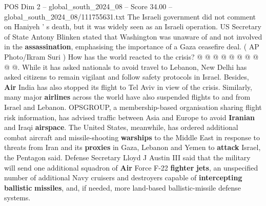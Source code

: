 \begin{textsample}{POS Dim 2 – global\_south\_2024\_08 – Score 34.00 – global\_south\_2024\_08/111755631.txt}
The Israeli government did not comment on Haniyeh ' s death, but it was widely seen as an Israeli operation.
US Secretary of State Antony Blinken stated that Washington was unaware of and not involved in the \textbf{assassination}, emphasising the importance of a Gaza ceasefire deal. ( AP Photo/Ikram Suri ) How has the world reacted to the crisis? @ @ @ @ @ @ @ @ @ @.
While it has asked nationals to avoid travel to Lebanon, New Delhi has asked citizens to remain vigilant and follow safety protocols in Israel.
Besides, \textbf{Air} India has also stopped its flight to Tel Aviv in view of the crisis.
Similarly, many major \textbf{airlines} across the world have also suspended flights to and from Israel and Lebanon.
OPSGROUP, a membership-based organisation sharing flight risk information, has advised traffic between Asia and Europe to avoid \textbf{Iranian} and Iraqi \textbf{airspace}.
The United States, meanwhile, has ordered additional combat aircraft and missile-shooting \textbf{warships} to the Middle East in response to threats from Iran and its \textbf{proxies} in Gaza, Lebanon and Yemen to \textbf{attack} Israel, the Pentagon said.
Defense Secretary Lloyd J Austin III said that the military will send one additional squadron of \textbf{Air} Force F-22 \textbf{fighter} \textbf{jets}, an unspecified number of additional Navy cruisers and destroyers capable of \textbf{intercepting} \textbf{ballistic} \textbf{missiles}, and, if needed, more land-based ballistic-missile defense systems.

\end{textsample}
